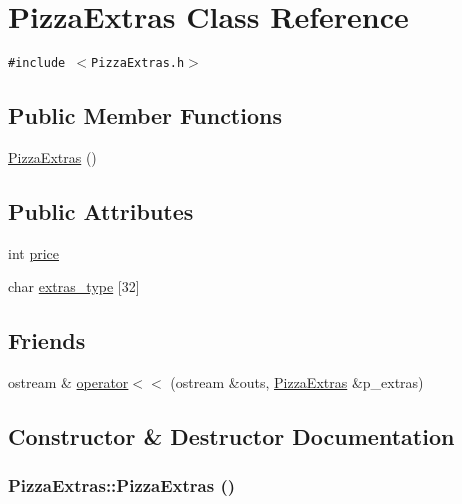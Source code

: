 \hypertarget{class_pizza_extras}{
\section{Pizza\-Extras Class Reference}
\label{class_pizza_extras}
}
{\tt \#include $<$Pizza\-Extras.h$>$}

\subsection*{Public Member Functions}
\begin{CompactItemize}
\item 
\hyperlink{class_pizza_extras_cfcaf8c3af29be3ecfb28690adf46452}{Pizza\-Extras} ()
\end{CompactItemize}
\subsection*{Public Attributes}
\begin{CompactItemize}
\item 
int \hyperlink{class_pizza_extras_78a5eb43deef9a7b5b9ce157b9d52ac4}{price}
\item 
char \hyperlink{class_pizza_extras_22c51029f6700dc22d22c0f972ff904e}{extras\_\-type} \mbox{[}32\mbox{]}
\end{CompactItemize}
\subsection*{Friends}
\begin{CompactItemize}
\item 
ostream \& \hyperlink{class_pizza_extras_01be6c7f4cc0dae56b875e6179844126}{operator$<$$<$} (ostream \&outs, \hyperlink{class_pizza_extras}{Pizza\-Extras} \&p\_\-extras)
\end{CompactItemize}


\subsection{Constructor \& Destructor Documentation}
\hypertarget{class_pizza_extras_cfcaf8c3af29be3ecfb28690adf46452}{
\subsubsection[PizzaExtras]{\setlength{\rightskip}{0pt plus 5cm}Pizza\-Extras::Pizza\-Extras ()}}
\label{class_pizza_extras_cfcaf8c3af29be3ecfb28690adf46452}





